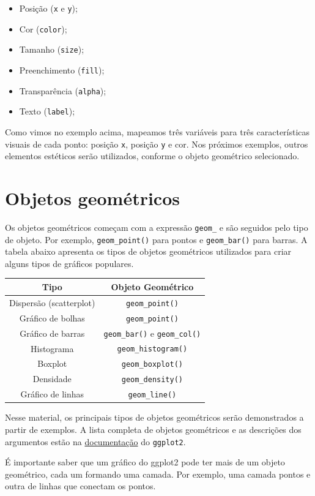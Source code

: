 \documentclass[]{book}
\providecommand{\tightlist}{%
  \setlength{\itemsep}{0pt}\setlength{\parskip}{0pt}}
\begin{document}
\begin{itemize}
\tightlist
\item
  Posição (\texttt{x} e \texttt{y});
\item
  Cor (\texttt{color});
\item
  Tamanho (\texttt{size});
\item
  Preenchimento (\texttt{fill});
\item
  Transparência (\texttt{alpha});
\item
  Texto (\texttt{label});
\end{itemize}

Como vimos no exemplo acima, mapeamos três variáveis para três
características visuais de cada ponto: posição \texttt{x}, posição
\texttt{y} e cor. Nos próximos exemplos, outros elementos estéticos
serão utilizados, conforme o objeto geométrico selecionado.

\section{Objetos geométricos}\label{objetos-geometricos}

Os objetos geométricos começam com a expressão \texttt{geom\_} e são
seguidos pelo tipo de objeto. Por exemplo, \texttt{geom\_point()} para
pontos e \texttt{geom\_bar()} para barras. A tabela abaixo apresenta os
tipos de objetos geométricos utilizados para criar alguns tipos de
gráficos populares.

\begin{longtable}[]{@{}cc@{}}
\toprule
Tipo & Objeto Geométrico\tabularnewline
\midrule
\endhead
Dispersão (scatterplot) & \texttt{geom\_point()}\tabularnewline
Gráfico de bolhas & \texttt{geom\_point()}\tabularnewline
Gráfico de barras & \texttt{geom\_bar()} e
\texttt{geom\_col()}\tabularnewline
Histograma & \texttt{geom\_histogram()}\tabularnewline
Boxplot & \texttt{geom\_boxplot()}\tabularnewline
Densidade & \texttt{geom\_density()}\tabularnewline
Gráfico de linhas & \texttt{geom\_line()}\tabularnewline
\bottomrule
\end{longtable}

Nesse material, os principais tipos de objetos geométricos serão
demonstrados a partir de exemplos. A lista completa de objetos
geométricos e as descrições dos argumentos estão na
\href{http://docs.ggplot2.org/current/}{documentação} do
\texttt{ggplot2}.

É importante saber que um gráfico do ggplot2 pode ter mais de um objeto
geométrico, cada um formando uma camada. Por exemplo, uma camada pontos
e outra de linhas que conectam os pontos.
\end{document}
